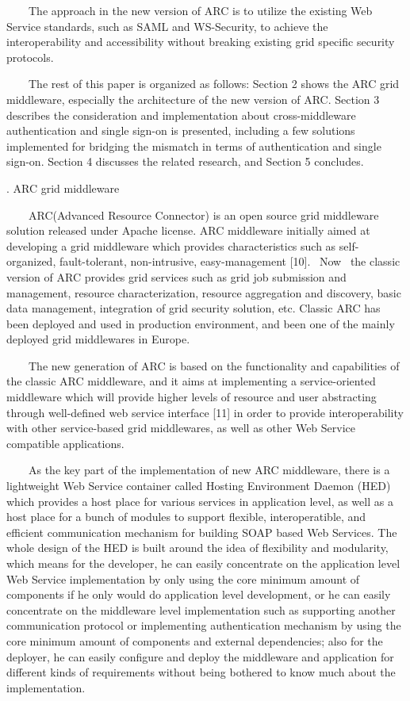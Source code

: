 \documentclass{article}
\begin{document}
\ \ \ \ The approach in the new version of ARC is to utilize the
existing Web Service standards, such as SAML and WS-Security, to
achieve the interoperability and accessibility without breaking
existing grid specific security protocols.

\ \ \ \ The rest of this paper is organized as follows: Section 2 shows
the ARC grid middleware, especially the architecture of the new version
of ARC. Section 3 describes the consideration and implementation about
cross-middleware authentication and single sign-on is presented,
including a few solutions implemented for bridging the mismatch in
terms of authentication and single sign-on. Section 4 discusses the
related research, and Section 5 concludes.


\bigskip

{. ARC grid middleware 
\par}

\ \ \ \ ARC(Advanced Resource Connector) is an open source grid
middleware solution released under Apache license. ARC middleware
initially aimed at developing a grid middleware which provides
characteristics such as self-organized, fault-tolerant, non-intrusive,
easy-management [10]. \ Now \ the classic version of ARC provides grid
services such as grid job submission and management, resource
characterization, resource aggregation and discovery, basic data
management, integration of grid security solution, etc. Classic ARC has
been deployed and used in production environment, and been one of the
mainly deployed grid middlewares in Europe.

\ \ \ \ The new generation of ARC is based on the functionality and
capabilities of the classic ARC middleware, and it aims at implementing
a service-oriented middleware which will provide higher levels of
resource and user abstracting through well-defined web service
interface [11] in order to provide interoperability with other
service-based grid middlewares, as well as other Web Service compatible
applications.

\ \ \ \ As the key part of the implementation of new ARC middleware,
there is a lightweight Web Service container called Hosting Environment
Daemon (HED) which provides a host place for various services in
application level, as well as a host place for a bunch of modules to
support flexible, interoperatible, and efficient communication
mechanism for building SOAP based Web Services. The whole design of the
HED is built around the idea of flexibility and modularity, which means
for the developer, he can easily concentrate on the application level
Web Service implementation by only using the core minimum amount of
components if he only would do application level development, or he can
easily concentrate on the middleware level implementation such as
supporting another communication protocol or implementing
authentication mechanism by using the core minimum amount of components
and external dependencies; also for the deployer, he can easily
configure and deploy the middleware and application for different kinds
of requirements without being bothered to know much about the
implementation.
\end{document}
